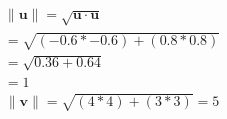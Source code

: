 \documentclass{report}
\begin{document}
\begin{question}{2}{}
    \begin{gather*}
        \lVert \mathbf{u} \rVert = \sqrt{\mathbf{u} \cdot \mathbf{u}} \\
        = \sqrt{(-0.6 * -0.6) + (0.8 * 0.8)} \\
        = \sqrt{0.36 + 0.64} \\
        = 1
    \end{gather*}
    \begin{gather*}
        \lVert \mathbf{v} \rVert = \sqrt{(4*4) + (3 * 3)} = 5
    \end{gather*}
\end{question}
\end{document}
